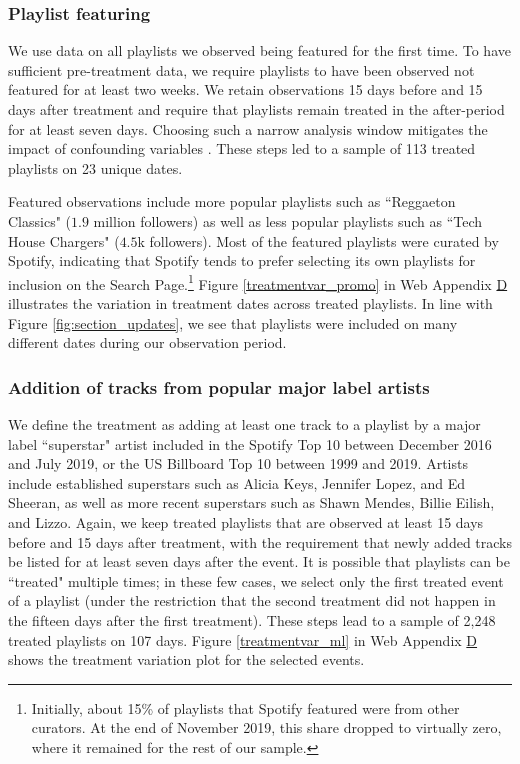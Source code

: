 \subsubsection{Playlist featuring} 
We use data on all playlists we observed being featured for the first time. To have sufficient pre-treatment data, we require playlists to have been observed not featured for at least two weeks. We retain observations 15 days before and 15 days after treatment and require that playlists remain treated in the after-period for at least seven days. Choosing such a narrow analysis window mitigates the impact of confounding variables \citep[e.g.,][]{orhun_16}. These steps led to a sample of 113 treated playlists on 23 unique dates. 

Featured observations include more popular playlists such as ``Reggaeton Classics" ($1.9$ million followers) as well as less popular playlists such as  ``Tech House Chargers" ($4.5$k followers). Most of the featured playlists were curated by Spotify, indicating that Spotify tends to prefer selecting its own playlists for inclusion on the Search Page.\footnote{Initially, about 15\% of playlists that Spotify featured were from other curators. At the end of November 2019, this share dropped to virtually zero, where it remained for the rest of our sample.} Figure \ref{treatmentvar_promo} in Web Appendix \hyperref[appendix:appendix_model]{D} illustrates the variation in treatment dates across treated playlists. In line with Figure \ref{fig:section_updates}, we see that playlists were included on many different dates during our observation period.

\subsubsection{Addition of tracks from popular major label artists}
We define the treatment as adding at least one track to a playlist by a major label ``superstar" artist included in the Spotify Top 10 between December 2016 and July 2019, or the US Billboard Top 10 between 1999 and
2019. Artists include established superstars such as Alicia Keys, Jennifer Lopez, and Ed Sheeran, as well as more recent superstars such as Shawn Mendes, Billie Eilish, and Lizzo. Again, we keep treated playlists that are observed at least 15 days before and 15 days after treatment, with the requirement that newly added tracks be listed for at least seven days after the event. It is possible that playlists can be ``treated" multiple times; in these few cases, we select only the first treated event of a playlist (under the restriction that the second treatment did not happen in the fifteen days after the first treatment). These steps lead to a sample of 2,248 treated playlists on 107 days. Figure \ref{treatmentvar_ml} in Web Appendix \hyperref[appendix:appendix_model]{D} shows the treatment variation plot for the selected events.


